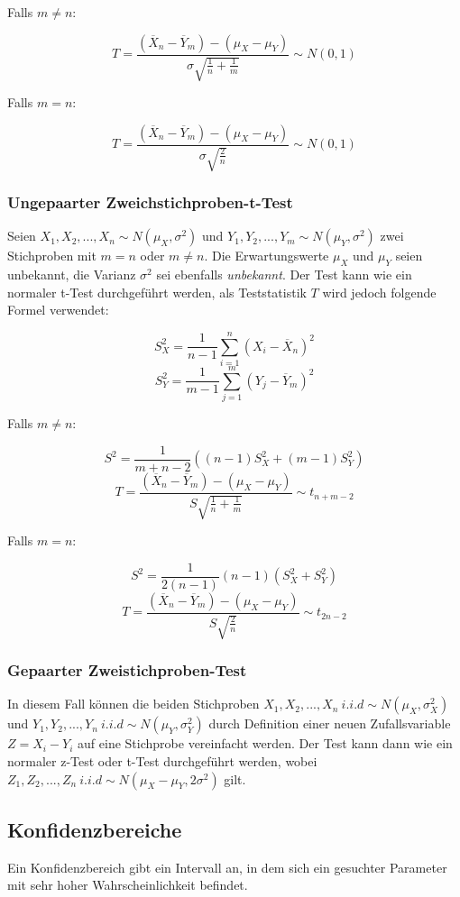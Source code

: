 \vspace{10pt}

Falls $m\neq n$:

\[
T = \frac{\left(\overline{X}_n-\overline{Y}_m\right)-\left(\mu_X-\mu_Y\right)}{\sigma\sqrt{\frac{1}{n}+\frac{1}{m}}}\sim N(0,1)
\]

Falls $m=n$:

\[
T = \frac{\left(\overline{X}_n-\overline{Y}_m\right)-\left(\mu_X-\mu_Y\right)}{\sigma\sqrt{\frac{2}{n}}}\sim N(0,1)
\]

\subsubsection{Ungepaarter Zweichstichproben-t-Test}
Seien $X_1,X_2,...,X_n \sim N(\mu_X,\sigma^2)$ und $Y_1,Y_2,...,Y_m \sim N(\mu_Y,\sigma^2)$ zwei Stichproben mit $m = n$ oder $m \neq n$. Die Erwartungswerte $\mu_X$ und $\mu_Y$ seien unbekannt, die Varianz $\sigma^2$ sei ebenfalls \emph{unbekannt}. Der Test kann wie ein normaler t-Test durchgeführt werden, als Teststatistik $T$ wird jedoch folgende Formel verwendet:

\[
S_{X}^{2}=\frac{1}{n-1}\sum\limits_{i=1}^{n}\left(X_i-\overline{X}_n\right)^2
\]
\[
S_{Y}^{2}=\frac{1}{m-1}\sum\limits_{j=1}^{m}\left(Y_j-\overline{Y}_m\right)^2
\]

Falls $m\neq n$:

\[
S^2=\frac{1}{m+n-2}\left((n-1)S_{X}^{2}+(m-1)S_{Y}^{2}\right)
\]
\[
T = \frac{\left(\overline{X}_n-\overline{Y}_m\right)-\left(\mu_X-\mu_Y\right)}{S\sqrt{\frac{1}{n}+\frac{1}{m}}}\sim t_{n+m-2}
\]

Falls $m=n$:

\[
S^2=\frac{1}{2(n-1)}(n-1)\left(S_{X}^{2}+S_{Y}^{2}\right)
\]
\[
T = \frac{\left(\overline{X}_n-\overline{Y}_m\right)-\left(\mu_X-\mu_Y\right)}{S\sqrt{\frac{2}{n}}}\sim t_{2n-2}
\]

\subsubsection{Gepaarter Zweistichproben-Test}
In diesem Fall können die beiden Stichproben $X_1,X_2,...,X_n\ i.i.d\sim N(\mu_X,\sigma_X^2)$ und $Y_1,Y_2,...,Y_n\ i.i.d\sim N(\mu_Y,\sigma_Y^2)$ durch Definition einer neuen Zufallsvariable $Z=X_i-Y_i$ auf eine Stichprobe vereinfacht werden. Der Test kann dann wie ein normaler z-Test oder t-Test durchgeführt werden, wobei $Z_1,Z_2,...,Z_n\ i.i.d\sim N(\mu_X-\mu_Y,2\sigma^2)$ gilt.

\subsection{Konfidenzbereiche}
Ein Konfidenzbereich gibt ein Intervall an, in dem sich ein gesuchter Parameter mit sehr hoher Wahrscheinlichkeit befindet.\\

